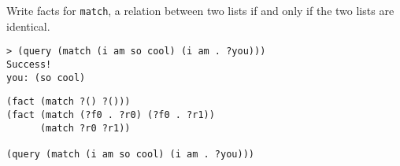 \question Write facts for {\tt match}, a relation between two lists  
if and only if the two lists are identical.

\begin{lstlisting}
> (query (match (i am so cool) (i am . ?you)))
Success!
you: (so cool)
\end{lstlisting}

\begin{solution}[1in]
\begin{lstlisting}
(fact (match ?() ?()))
(fact (match (?f0 . ?r0) (?f0 . ?r1))
      (match ?r0 ?r1))

(query (match (i am so cool) (i am . ?you)))
\end{lstlisting}
\end{solution}

